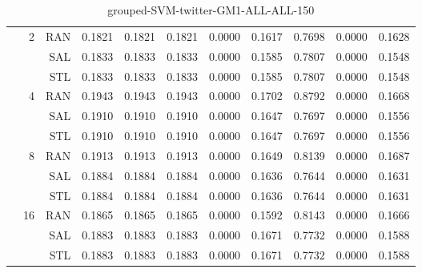 \begin{center}
\begin{table}[htbp]
\begin{center}
\begin{tabular}{ | r | r | r | r | r | r | r | r | r | r | r |}
 & \multirow{3}{*}{2} & RAN & 0.1821 & 0.1821 & 0.1821 & 0.0000 & 0.1617 & 0.7698 & 0.0000 & 0.1628\\ \cline{3-11}
 &   & SAL & 0.1833 & 0.1833 & 0.1833 & 0.0000 & 0.1585 & 0.7807 & 0.0000 & 0.1548\\ \cline{3-11}
 &   & STL & 0.1833 & 0.1833 & 0.1833 & 0.0000 & 0.1585 & 0.7807 & 0.0000 & 0.1548\\ \cline{2-11}
 & \multirow{3}{*}{4} & RAN & 0.1943 & 0.1943 & 0.1943 & 0.0000 & 0.1702 & 0.8792 & 0.0000 & 0.1668\\ \cline{3-11}
 &   & SAL & 0.1910 & 0.1910 & 0.1910 & 0.0000 & 0.1647 & 0.7697 & 0.0000 & 0.1556\\ \cline{3-11}
 &   & STL & 0.1910 & 0.1910 & 0.1910 & 0.0000 & 0.1647 & 0.7697 & 0.0000 & 0.1556\\ \cline{2-11}
 & \multirow{3}{*}{8} & RAN & 0.1913 & 0.1913 & 0.1913 & 0.0000 & 0.1649 & 0.8139 & 0.0000 & 0.1687\\ \cline{3-11}
 &   & SAL & 0.1884 & 0.1884 & 0.1884 & 0.0000 & 0.1636 & 0.7644 & 0.0000 & 0.1631\\ \cline{3-11}
 &   & STL & 0.1884 & 0.1884 & 0.1884 & 0.0000 & 0.1636 & 0.7644 & 0.0000 & 0.1631\\ \cline{2-11}
 & \multirow{3}{*}{16} & RAN & 0.1865 & 0.1865 & 0.1865 & 0.0000 & 0.1592 & 0.8143 & 0.0000 & 0.1666\\ \cline{3-11}
 &   & SAL & 0.1883 & 0.1883 & 0.1883 & 0.0000 & 0.1671 & 0.7732 & 0.0000 & 0.1588\\ \cline{3-11}
 &   & STL & 0.1883 & 0.1883 & 0.1883 & 0.0000 & 0.1671 & 0.7732 & 0.0000 & 0.1588\\ \cline{2-11}
\hline
\end{tabular}
\caption{grouped-SVM-twitter-GM1-ALL-ALL-150}
\end{center}
 \end{table}
\end{center}

